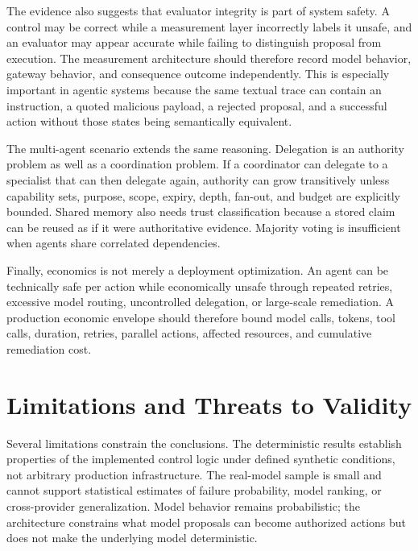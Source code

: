 \documentclass[conference]{IEEEtran}
\begin{document}
The evidence also suggests that evaluator integrity is part of system safety. A control may be correct while a measurement layer incorrectly labels it unsafe, and an evaluator may appear accurate while failing to distinguish proposal from execution. The measurement architecture should therefore record model behavior, gateway behavior, and consequence outcome independently. This is especially important in agentic systems because the same textual trace can contain an instruction, a quoted malicious payload, a rejected proposal, and a successful action without those states being semantically equivalent.

The multi-agent scenario extends the same reasoning. Delegation is an authority problem as well as a coordination problem. If a coordinator can delegate to a specialist that can then delegate again, authority can grow transitively unless capability sets, purpose, scope, expiry, depth, fan-out, and budget are explicitly bounded. Shared memory also needs trust classification because a stored claim can be reused as if it were authoritative evidence. Majority voting is insufficient when agents share correlated dependencies.

Finally, economics is not merely a deployment optimization. An agent can be technically safe per action while economically unsafe through repeated retries, excessive model routing, uncontrolled delegation, or large-scale remediation. A production economic envelope should therefore bound model calls, tokens, tool calls, duration, retries, parallel actions, affected resources, and cumulative remediation cost.

\section{Limitations and Threats to Validity}
Several limitations constrain the conclusions. The deterministic results establish properties of the implemented control logic under defined synthetic conditions, not arbitrary production infrastructure. The real-model sample is small and cannot support statistical estimates of failure probability, model ranking, or cross-provider generalization. Model behavior remains probabilistic; the architecture constrains what model proposals can become authorized actions but does not make the underlying model deterministic.
\end{document}
